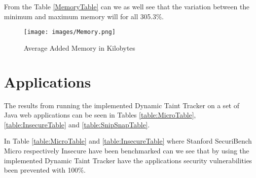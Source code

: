 From the Table \ref{MemoryTable} can we as well see that the variation between the minimum and maximum memory will for all 305.3\%.

\begin{figure}[H]
	\centering
	\texttt{[image: images/Memory.png]}
	\caption{Average Added Memory in Kilobytes}
	\label{fig:Memory}
\end{figure}



\section{Applications}
The results from running the implemented Dynamic Taint Tracker on a set of Java web applications can be seen in Tables \ref{table:MicroTable}, \ref{table:InsecureTable} and \ref{table:SnipSnapTable}. 

In Table \ref{table:MicroTable} and \ref{table:InsecureTable} where Stanford SecuriBench Micro \parencite{securiBenchMicro} respectively Insecure \parencite{insecure} have been benchmarked can we see that by using the implemented Dynamic Taint Tracker have the applications security vulnerabilities been prevented with 100\%. 


\begin{table}[H]
  \centering
  \caption{Security Vulnerabilities Found in Stanford SecuriBench Micro}
  \label{table:MicroTable}
\end{table}


\begin{table}[H]
  \centering
  \caption{Security Vulnerabilities Found in Insecure}
  \label{table:InsecureTable}
\end{table}


